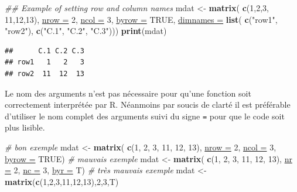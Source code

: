 \documentclass[twoside,symmetric]{book}
\newenvironment{Shaded}{}{}
\newcommand{\CommentTok}[1]{\textit{#1}}
\newcommand{\DataTypeTok}[1]{\underline{#1}}
\newcommand{\DecValTok}[1]{#1}
\newcommand{\KeywordTok}[1]{\textbf{#1}}
\newcommand{\NormalTok}[1]{#1}
\newcommand{\OtherTok}[1]{#1}
\newcommand{\StringTok}[1]{#1}
\begin{document}
\begin{Shaded}
\begin{Highlighting}[]
\CommentTok{## Example of setting row and column names}
\NormalTok{mdat <-}\StringTok{ }\KeywordTok{matrix}\NormalTok{(}
  \KeywordTok{c}\NormalTok{(}\DecValTok{1}\NormalTok{,}\DecValTok{2}\NormalTok{,}\DecValTok{3}\NormalTok{, }\DecValTok{11}\NormalTok{,}\DecValTok{12}\NormalTok{,}\DecValTok{13}\NormalTok{), }
  \DataTypeTok{nrow =} \DecValTok{2}\NormalTok{, }\DataTypeTok{ncol =} \DecValTok{3}\NormalTok{, }\DataTypeTok{byrow =} \OtherTok{TRUE}\NormalTok{,}
  \DataTypeTok{dimnames =} \KeywordTok{list}\NormalTok{(}
    \KeywordTok{c}\NormalTok{(}\StringTok{"row1"}\NormalTok{, }\StringTok{"row2"}\NormalTok{),}
    \KeywordTok{c}\NormalTok{(}\StringTok{"C.1"}\NormalTok{, }\StringTok{"C.2"}\NormalTok{, }\StringTok{"C.3"}\NormalTok{)))}
\KeywordTok{print}\NormalTok{(mdat)}
\end{Highlighting}
\end{Shaded}

\begin{verbatim}
##      C.1 C.2 C.3
## row1   1   2   3
## row2  11  12  13
\end{verbatim}

Le nom des arguments n'est pas nécessaire pour qu'une fonction soit correctement interprétée par R. Néanmoins par soucis de clarté il est préférable d'utiliser le nom complet des arguments suivi du signe \texttt{=} pour que le code soit plus lisible.

\begin{Shaded}
\begin{Highlighting}[]
\CommentTok{# bon exemple}
\NormalTok{mdat <-}\StringTok{ }\KeywordTok{matrix}\NormalTok{(}
  \KeywordTok{c}\NormalTok{(}\DecValTok{1}\NormalTok{, }\DecValTok{2}\NormalTok{, }\DecValTok{3}\NormalTok{, }\DecValTok{11}\NormalTok{, }\DecValTok{12}\NormalTok{, }\DecValTok{13}\NormalTok{), }
  \DataTypeTok{nrow =} \DecValTok{2}\NormalTok{, }\DataTypeTok{ncol =} \DecValTok{3}\NormalTok{, }
  \DataTypeTok{byrow =} \OtherTok{TRUE}\NormalTok{)}
\CommentTok{# mauvais exemple}
\NormalTok{mdat <-}\StringTok{ }\KeywordTok{matrix}\NormalTok{(}
  \KeywordTok{c}\NormalTok{(}\DecValTok{1}\NormalTok{, }\DecValTok{2}\NormalTok{, }\DecValTok{3}\NormalTok{, }\DecValTok{11}\NormalTok{, }\DecValTok{12}\NormalTok{, }\DecValTok{13}\NormalTok{), }
  \DataTypeTok{nr =} \DecValTok{2}\NormalTok{, }\DataTypeTok{nc =} \DecValTok{3}\NormalTok{, }
  \DataTypeTok{byr =}\NormalTok{ T)}
\CommentTok{# très mauvais exemple}
\NormalTok{mdat <-}\StringTok{ }\KeywordTok{matrix}\NormalTok{(}\KeywordTok{c}\NormalTok{(}\DecValTok{1}\NormalTok{,}\DecValTok{2}\NormalTok{,}\DecValTok{3}\NormalTok{,}\DecValTok{11}\NormalTok{,}\DecValTok{12}\NormalTok{,}\DecValTok{13}\NormalTok{),}\DecValTok{2}\NormalTok{,}\DecValTok{3}\NormalTok{,T)}
\end{Highlighting}
\end{Shaded}
\end{document}
